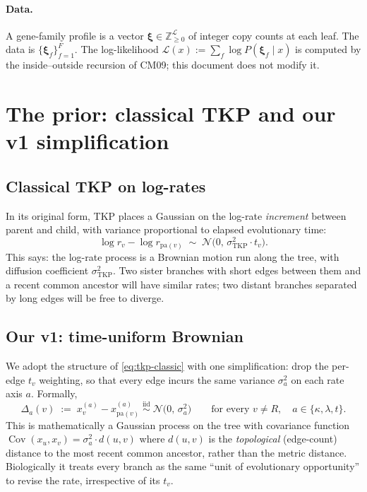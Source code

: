 \documentclass[11pt]{article}
\newcommand{\Z}{\mathbb{Z}}
\newcommand{\Leaves}{\mathcal{L}}
\newcommand{\pa}{\mathrm{pa}}
\newcommand{\troot}{R}
\newcommand{\Prof}{\boldsymbol{\xi}}   %
\newcommand{\rate}{\kappa}             %
\newcommand{\dup}{\lambda}             %
\newcommand{\edgelen}{t}               %
\newcommand{\Ll}{\mathcal{L}}          %
\DeclareMathOperator{\Cov}{Cov}
\theoremstyle{definition}
\begin{document}
\paragraph{Data.}
A gene-family profile is a vector
$\Prof \in \Z_{\ge 0}^\Leaves$ of integer copy counts at each leaf.
The data is $\{\Prof_f\}_{f=1}^F$. The log-likelihood
$\Ll(x) := \sum_f \log P(\Prof_f \mid x)$ is computed by the
inside--outside recursion of CM09; this document does not modify it.

\section{The prior: classical TKP and our v1 simplification}
\label{sec:prior}

\subsection{Classical TKP on log-rates}

In its original form, TKP places a Gaussian on the log-rate
\emph{increment} between parent and child, with variance proportional
to elapsed evolutionary time:
\begin{equation}
\log r_v - \log r_{\pa(v)}
\;\sim\;
\mathcal{N}\!\bigl(0,\, \sigma_{\mathrm{TKP}}^2 \cdot \edgelen_v\bigr).
\label{eq:tkp-classic}
\end{equation}
This says: the log-rate process is a Brownian motion run along the
tree, with diffusion coefficient $\sigma_{\mathrm{TKP}}^2$. Two
sister branches with short edges between them and a recent common
ancestor will have similar rates; two distant branches separated by
long edges will be free to diverge.

\subsection{Our v1: time-uniform Brownian}

We adopt the structure of \eqref{eq:tkp-classic} with one
simplification: drop the per-edge $\edgelen_v$ weighting, so that
every edge incurs the same variance $\sigma_a^2$ on each rate axis
$a$. Formally,
\begin{equation}
\Delta_a(v)
\;:=\;
x^{(a)}_v - x^{(a)}_{\pa(v)}
\;\overset{\text{iid}}{\sim}\;
\mathcal{N}\!\bigl(0,\, \sigma_a^2\bigr)
\qquad
\text{for every } v\neq \troot,\quad a\in\{\rate,\dup,\edgelen\}.
\label{eq:tkp-v1}
\end{equation}
This is mathematically a Gaussian process on the tree with covariance
function $\Cov(x_u, x_v) = \sigma_a^2 \cdot d(u,v)$ where $d(u,v)$ is
the \emph{topological} (edge-count) distance to the most recent
common ancestor, rather than the metric distance. Biologically it
treats every branch as the same ``unit of evolutionary opportunity''
to revise the rate, irrespective of its $\edgelen_v$.
\end{document}
